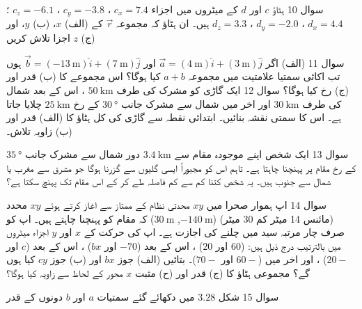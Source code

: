 سوال 10 
ہٹاؤ 
\(c\)
 اور
\(d\)
کے میٹروں میں اجزاء
\(c_x=7.4 \)
، 
\(c_y=-3.8 \)
 ،
\(c_z=-6.1\)
؛ 
\(d_x=4.4\)
،
\(d_y=-2.0\)
،
\(d_z=3.3\)
ہیں۔ ان ہٹاؤ کہ مجموعہ
 \(\vec{r}\) 
کے 
(الف) \(x\)،
(ب) \(y\)،
اور 
(ج) \(z\)
اجزا تلاش کریں

سوال 11 
(الف) اگر 
\(\vec{a}=(\SI{4}{\meter})\hat{i}+(\SI{3}{\meter})\hat{j}\)
اور
\(\vec{b}=(\SI{-13}{\meter})\hat{i}+(\SI{7}{\meter})\hat{j}\)
ہوں تب اکائی سمتیا علامتیت میں مجموعہ 
\(a+b\)
کیا ہوگا؟ اس مجموعے کا 
(ب) قدر اور 
(ج) رخ کیا ہوگا؟
سوال 12 
ایک گاڑی کو مشرک کی طرف 
\(\SI{50}{\kilo\meter}\) 
، اس کے بعد شمال کی طرف 
 \(\SI{30}{\kilo\meter}\)
اور اخر میں شمال سے مشرک جانب 
 \(\SI{30}{\degree}\)
کے رخ
\(\SI{25}{\kilo\meter}\)
چلایا جاتا ہے۔ اس کا سمتی نقشہ بنائیں۔ ابتدائی نقطہ سے گاڑی کی کل ہٹاؤ کا (الف) قدر اور 
(ب) زاویہ تلاش۔ 

سوال 13 
ایک شخص اپنے موجودہ مقام سے 
 \(\SI{3.4}{\kilo\meter}\)
دور شمال سے مشرک جانب 
\(\SI{35}{\degree}\)
کے رخ مقام پر پہنچنا چاہتا ہے۔ تاہم اس کو مجبوراً ایسی گلیوں سے گزرنا ہوگا جو مشرق سے مغرب یا شمال سے جنوب ہیں۔ یہ شخص کتنا کم سے کم فاصلہ طے کر کے اس مقام تک پہنچ سکتا ہے؟ 

سوال 14 
اپ ہموار صحرا میں
\(xy\)
محدتی نظام کے ممتاز سے اغاز کرتے ہوئے 
\(xy\)
محدد (مائنس 14 میٹر کم 30 میٹر)
(\(\SI{-140}{\meter}\), \(\SI{30}{\meter}\))
کہ مقام کو پہنچنا چاہتے ہیں۔ اپ کو صرف چار مرتبہ سید میں چلنے کی اجازت ہے۔ اپ کی حرکت کے 
\(x\)
اور 
\(y\) 
اجزاء میٹروں میں بالترتیب درج ذیل ہیں: 
 (\(60\) اور \(20\))
، اس کے بعد 
 (\(-70\) اور \(bx\))
، اس کے بعد 
 (\(c\) اور \(20-\))
، اور اخر میں 
(\(60-\) اور \(70-\))۔ 
بتائیں 
(الف) جوز 
\(bx\)
اور 
(ب) جوز 
\(cy\) 
کیا ہوں گے؟ مجموعی ہٹاؤ کا 
(ج) قدر 
اور 
(ح) مثبت 
\(x\) 
محور کے لحاظ سے زاویہ کیا ہوگا؟ 

سوال 15 
شکل 
\(3.28\)
میں دکھائے گئے سمتیات 
\(a\) 
اور 
\(b\)
دونوں کے قدر
